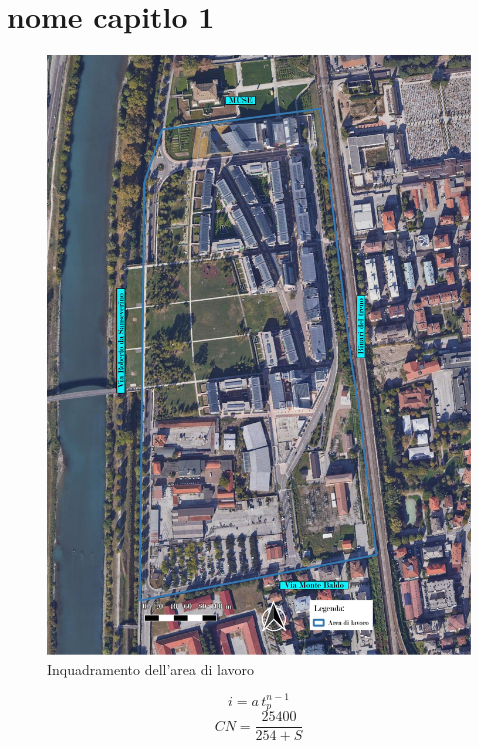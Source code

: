 \chapter{nome capitlo 1}
\begin{figure}[htbp]
    \centering
    \includegraphics[trim=0cm 0cm 0cm 0cm,clip,frame,width=\textwidth]{IMG/inquadramento.pdf} 
    \caption{Inquadramento dell'area di lavoro}
    \label{fig:inquadramento}
    \end{figure}

\begin{equation}
    i = a \, t_p ^{n - 1}
\end{equation}
\begin{equation}
    CN = \frac{25400}{254 + S}
\end{equation}


